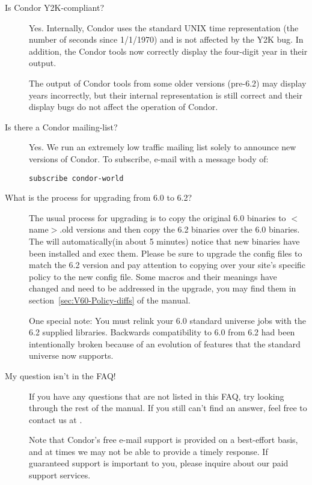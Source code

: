 \begin{description}

\item[Is Condor Y2K-compliant?]

Yes.
Internally, Condor uses the standard UNIX time representation (the
number of seconds since 1/1/1970) and is not affected by the Y2K bug.
In addition, the Condor tools now correctly display the four-digit
year in their output.

The output of Condor tools from some older versions (pre-6.2) may
display years incorrectly, but their internal representation is still
correct and their display bugs do not affect the operation of Condor.


\item[Is there a Condor mailing-list?]

Yes.
We run an extremely low traffic mailing list solely to announce new
versions of Condor.
To subscribe, e-mail  with a message body
of:

\begin{verbatim}subscribe condor-world\end{verbatim}



\item[What is the process for upgrading from 6.0 to 6.2?]

The usual process for upgrading is to copy the original 6.0 binaries
to $<$name$>$.old versions and then copy the 6.2 binaries over the 6.0
binaries. The  will automatically(in about 5 minutes)
notice that new binaries have been installed and exec them. Please be sure
to upgrade the config files to match the 6.2 version and pay attention
to copying over your site's specific policy to the new config file. Some
macros and their meanings have changed and need to be addressed in the
upgrade, you may find them in section~\ref{sec:V60-Policy-diffs} of the
manual.

One special note: You must relink your 6.0 standard universe jobs with
the 6.2 supplied libraries. Backwards compatibility to 6.0 from 6.2 had
been intentionally broken because of an evolution of features that the
standard universe now supports.

\item[My question isn't in the FAQ!]

If you have any questions that are not listed in this FAQ, try looking
through the rest of the manual.
If you still can't find an answer, feel free to contact us at
.

Note that Condor's free e-mail support is provided on a best-effort
basis, and at times we may not be able to provide a timely response.
If guaranteed support is important to you, please inquire about our
paid support services.
\end{description}



